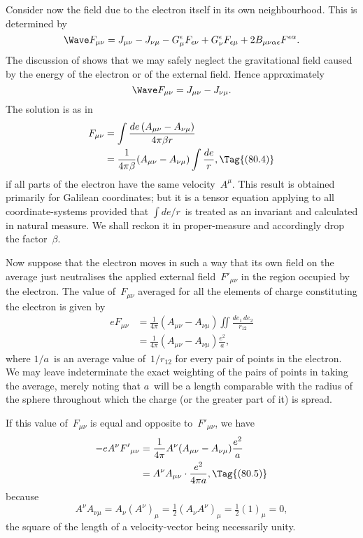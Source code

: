 \documentclass[12pt]{book}
\begin{document}
Consider now the field due to the electron itself in its own neighbourhood.
This is determined by~
\[
\Wave F_{\mu\nu} = J_{\mu\nu} - J_{\nu\mu}
- G_{\mu}^{\epsilon} F_{\epsilon\nu} + G_{\nu}^{\epsilon} F_{\epsilon\mu}
+ 2B_{\mu\nu\alpha\epsilon} F^{\epsilon\alpha}.
\]
The discussion of  shows that we may safely neglect the gravitational
field caused by the energy of the electron or of the external field. Hence
approximately
\[
\Wave F_{\mu\nu} = J_{\mu\nu} - J_{\nu\mu}.
\]
The solution is as in~
\begin{align*}
  F_{\mu\nu} &= \int \frac{de\, (A_{\mu\nu} - A_{\nu\mu})}{4\pi\beta r} \\
  &= \frac{1}{4\pi\beta}(A_{\mu\nu} - A_{\nu\mu}) \int \frac{de}{r},
  \Tag{(80.4)}
\end{align*}
if all parts of the electron have the same velocity~$A^{\mu}$. This result is obtained
primarily for Galilean coordinates; but it is a tensor equation applying to
all coordinate-systems provided that $\int de/r$~is treated as an invariant and
calculated in natural measure. We shall reckon it in proper-measure and
accordingly drop the factor~$\beta$.

Now suppose that the electron moves in such a way that its own field
on the average just neutralises the applied external field~${F'}_{\mu\nu}$ in the region
occupied by the electron. The value of~$F_{\mu\nu}$ averaged for all the elements of
charge constituting the electron is given by
\begin{align*}
  eF_{\mu\nu}
  &= \frac{1}{4\pi}(A_{\mu\nu} - A_{\nu\mu}) \iint \frac{de_{1}\, de_{2}}{r_{12}} \\
  &= \frac{1}{4\pi}(A_{\mu\nu} - A_{\nu\mu}) \frac{e^{2}}{a},
\end{align*}
where $1/a$~is an average value of~$1/r_{12}$ for every pair of points in the electron.
We may leave indeterminate the exact weighting of the pairs of points in
taking the average, merely noting that $a$~will be a length comparable with
the radius of the sphere throughout which the charge (or the greater part of
it) is spread.

If this value of~$F_{\mu\nu}$ is equal and opposite to~${F'}_{\mu\nu}$, we have
\begin{align*}
  -eA^{\nu} {F'}_{\mu\nu}
  &= \frac{1}{4\pi} A^{\nu} (A_{\mu\nu} - A_{\nu\mu}) \frac{e^{2}}{a} \\
  &= A^{\nu} A_{\mu\nu} \cdot \frac{e^{2}}{4\pi a},
  \Tag{(80.5)}
\end{align*}
because
\[
A^{\nu} A_{\nu\mu} = A_{\nu} (A^{\nu})_{\mu}
= \tfrac{1}{2} (A_{\nu} A^{\nu})_{\mu}
= \tfrac{1}{2} (1)_{\mu}
= 0,
\]
the square of the length of a velocity-vector being necessarily unity.
\end{document}
